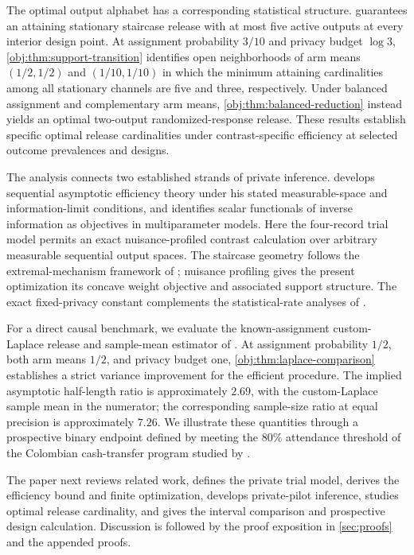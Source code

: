 The optimal output alphabet has a corresponding statistical structure.  guarantees an attaining stationary staircase release with at most five active outputs at every interior design point. At assignment probability \(3/10\) and privacy budget \(\log 3\), \cref{obj:thm:support-transition} identifies open neighborhoods of arm means \((1/2,1/2)\) and \((1/10,1/10)\) in which the minimum attaining cardinalities among all stationary channels are five and three, respectively. Under balanced assignment and complementary arm means, \cref{obj:thm:balanced-reduction} instead yields an optimal two-output randomized-response release. These results establish specific optimal release cardinalities under contrast-specific efficiency at selected outcome prevalences and designs.

The analysis connects two established strands of private inference.  develops sequential asymptotic efficiency theory under his stated measurable-space and information-limit conditions, and identifies scalar functionals of inverse information as objectives in multiparameter models. Here the four-record trial model permits an exact nuisance-profiled contrast calculation over arbitrary measurable sequential output spaces. The staircase geometry follows the extremal-mechanism framework of \citet[Theorems 2 and 4]{KairouzOhViswanath2016}; nuisance profiling gives the present optimization its concave weight objective and associated support structure. The exact fixed-privacy constant complements the statistical-rate analyses of \citet{DuchiJordanWainwright2018,Rohde2020,Duchi2024}.

For a direct causal benchmark, we evaluate the known-assignment custom-Laplace release and sample-mean estimator of \citet[Sections 3.1 and 3.3, Theorem 7, and Appendix A.5]{OhnishiAwan2025}. At assignment probability \(1/2\), both arm means \(1/2\), and privacy budget one, \cref{obj:thm:laplace-comparison} establishes a strict variance improvement for the efficient procedure. The implied asymptotic half-length ratio is approximately \(2.69\), with the custom-Laplace sample mean in the numerator; the corresponding sample-size ratio at equal precision is approximately \(7.26\). We illustrate these quantities through a prospective binary endpoint defined by meeting the \(80\%\) attendance threshold of the Colombian cash-transfer program studied by \citet{BarreraOsorioEtAl2011}.

The paper next reviews related work, defines the private trial model, derives the efficiency bound and finite optimization, develops private-pilot inference, studies optimal release cardinality, and gives the interval comparison and prospective design calculation. Discussion is followed by the proof exposition in \cref{sec:proofs} and the appended proofs.
